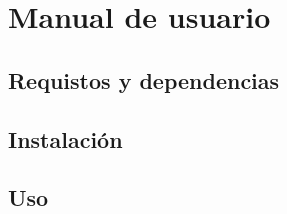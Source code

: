 \section{Manual de usuario}
\subsection{Requistos y dependencias}
\subsection{Instalaci\'on}
\subsection{Uso}
\newpage